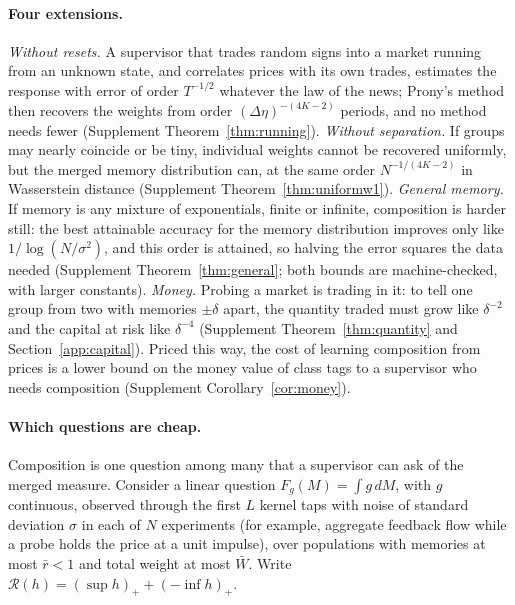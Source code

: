 \documentclass[12pt]{article}
\theoremstyle{definition}
\theoremstyle{remark}
\begin{document}
\paragraph{Four extensions.} \emph{Without resets.} A supervisor that trades random signs into a market running from an unknown state, and correlates prices with its own trades, estimates the response with error of order $T^{-1/2}$ whatever the law of the news; Prony's method then recovers the weights from order $(\Delta\eta)^{-(4K-2)}$ periods, and no method needs fewer (Supplement Theorem~\ref{thm:running}). \emph{Without separation.} If groups may nearly coincide or be tiny, individual weights cannot be recovered uniformly, but the merged memory distribution can, at the same order $N^{-1/(4K-2)}$ in Wasserstein distance (Supplement Theorem~\ref{thm:uniformw1}). \emph{General memory.} If memory is any mixture of exponentials, finite or infinite, composition is harder still: the best attainable accuracy for the memory distribution improves only like $1/\log(N/\sigma^2)$, and this order is attained, so halving the error squares the data needed (Supplement Theorem~\ref{thm:general}; both bounds are machine-checked, with larger constants). \emph{Money.} Probing a market is trading in it: to tell one group from two with memories $\pm\delta$ apart, the quantity traded must grow like $\delta^{-2}$ and the capital at risk like $\delta^{-4}$ (Supplement Theorem~\ref{thm:quantity} and Section~\ref{app:capital}). Priced this way, the cost of learning composition from prices is a lower bound on the money value of class tags to a supervisor who needs composition (Supplement Corollary~\ref{cor:money}).

\paragraph{Which questions are cheap.} Composition is one question among many that a supervisor can ask of the merged measure. Consider a linear question $F_g(M)=\int g\,dM$, with $g$ continuous, observed through the first $L$ kernel taps with noise of standard deviation $\sigma$ in each of $N$ experiments (for example, aggregate feedback flow while a probe holds the price at a unit impulse), over populations with memories at most $\bar r<1$ and total weight at most $\bar W$. Write $\mathcal R(h)=(\sup h)_++(-\inf h)_+$.
\end{document}
